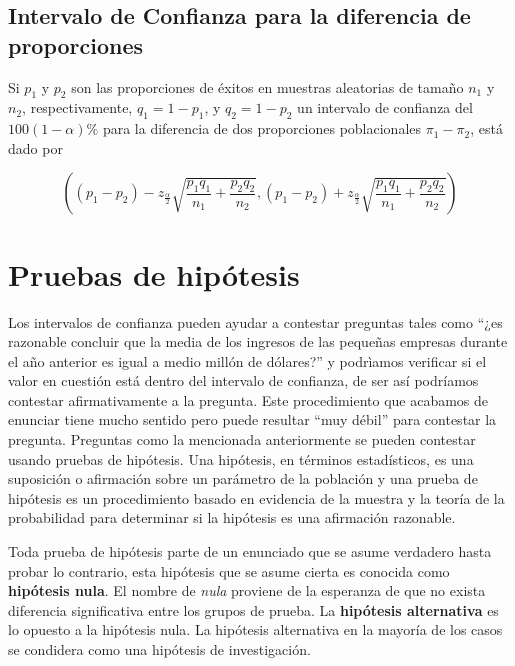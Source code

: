 \documentclass[]{book}
\begin{document}
\hypertarget{intervalo-de-confianza-para-la-diferencia-de-proporciones}{%
\subsection{Intervalo de Confianza para la diferencia de proporciones}\label{intervalo-de-confianza-para-la-diferencia-de-proporciones}}

Si \(p_1\) y \(p_2\) son las proporciones de éxitos en muestras aleatorias de tamaño \(n_1\) y \(n_2\), respectivamente, \(q_1 = 1- p_1\), y \(q_2 = 1- p_2\) un intervalo de confianza del \(100\left(1- \alpha \right)\%\) para la diferencia de dos proporciones poblacionales \(\pi_1-\pi_2\), está dado por

\begin{equation} 
\left( \left( p_1 - p_2 \right) - z_{\frac{\alpha}{2}}\sqrt{\dfrac{p_1q_1}{n_1} + \dfrac{p_2q_2}{n_2}} , \left( p_1 - p_2 \right) + z_{\frac{\alpha}{2}}\sqrt{\dfrac{p_1q_1}{n_1} + \dfrac{p_2q_2}{n_2}}  \right)
\label{eq:icprop2}
\end{equation}

\hypertarget{ph}{%
\section{Pruebas de hipótesis}\label{ph}}

Los intervalos de confianza pueden ayudar a contestar preguntas tales como ``¿es razonable concluir que la media de los ingresos de las pequeñas empresas durante el año anterior es igual a medio millón de dólares?'' y podrìamos verificar si el valor en cuestión está dentro del intervalo de confianza, de ser así podríamos contestar afirmativamente a la pregunta. Este procedimiento que acabamos de enunciar tiene mucho sentido pero puede resultar ``muy débil'' para contestar la pregunta. Preguntas como la mencionada anteriormente se pueden contestar usando pruebas de hipótesis. Una hipótesis, en términos estadísticos, es una suposición o afirmación sobre un parámetro de la población y una prueba de hipótesis es un procedimiento basado en evidencia de la muestra y la teoría de la probabilidad para determinar si la hipótesis es una afirmación razonable.

Toda prueba de hipótesis parte de un enunciado que se asume verdadero hasta probar lo contrario, esta hipótesis que se asume cierta es conocida como \textbf{hipótesis nula}. El nombre de \emph{nula} proviene de la esperanza de que no exista diferencia significativa entre los grupos de prueba. La \textbf{hipótesis alternativa} es lo opuesto a la hipótesis nula. La hipótesis alternativa en la mayoría de los casos se condidera como una hipótesis de investigación.
\end{document}
